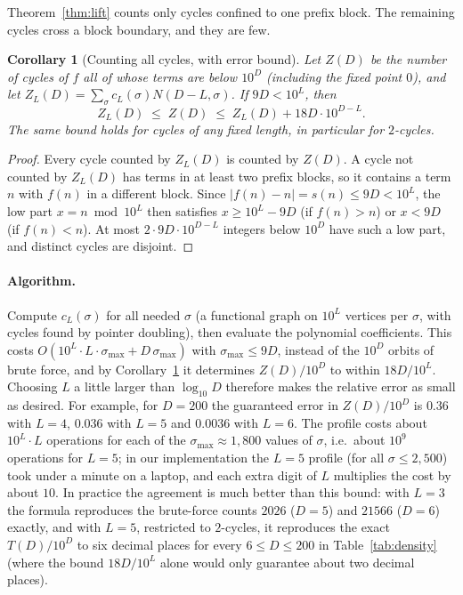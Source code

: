 \documentclass[11pt]{article}
\newtheorem{corollary}[theorem]{Corollary}
\theoremstyle{definition}
\theoremstyle{remark}
\begin{document}
Theorem~\ref{thm:lift} counts only cycles confined to one prefix block. The
remaining cycles cross a block boundary, and they are few.

\begin{corollary}[Counting all cycles, with error bound]\label{cor:lifterr}
Let $Z(D)$ be the number of cycles of $f$ all of whose terms are below $10^D$
(including the fixed point $0$), and let $Z_L(D)=\sum_\sigma
c_L(\sigma)N(D-L,\sigma)$. If $9D<10^L$, then
\[
  Z_L(D)\;\le\;Z(D)\;\le\;Z_L(D)+18D\cdot10^{D-L}.
\]
The same bound holds for cycles of any fixed length, in particular for
$2$-cycles.
\end{corollary}

\begin{proof}
Every cycle counted by $Z_L(D)$ is counted by $Z(D)$. A cycle not counted by
$Z_L(D)$ has terms in at least two prefix blocks, so it contains a term $n$
with $f(n)$ in a different block. Since $|f(n)-n|=s(n)\le9D<10^L$, the low
part $x=n\bmod10^L$ then satisfies $x\ge10^L-9D$ (if $f(n)>n$) or $x<9D$ (if
$f(n)<n$). At most $2\cdot9D\cdot10^{D-L}$ integers below $10^D$ have such a
low part, and distinct cycles are disjoint.
\end{proof}

\paragraph{Algorithm.} Compute $c_L(\sigma)$ for all needed $\sigma$ (a
functional graph on $10^L$ vertices per $\sigma$, with cycles found by pointer
doubling), then evaluate the polynomial coefficients. This costs
$O(10^L\cdot L\cdot\sigma_{\max}+D\,\sigma_{\max})$ with $\sigma_{\max}\le9D$,
instead of the $10^D$ orbits of brute force, and by
Corollary~\ref{cor:lifterr} it determines $Z(D)/10^D$ to within $18D/10^L$.
Choosing $L$ a little larger than $\log_{10}D$ therefore makes the relative
error as small as desired. For example, for $D=200$ the guaranteed error in
$Z(D)/10^D$ is $0.36$ with $L=4$, $0.036$ with $L=5$ and $0.0036$ with $L=6$.
The profile costs about $10^L\cdot L$ operations for each of the
$\sigma_{\max}\approx1{,}800$ values of $\sigma$, i.e.\ about $10^9$ operations
for $L=5$; in our implementation the $L=5$ profile (for all
$\sigma\le2{,}500$) took under a minute on a laptop, and each extra digit of
$L$ multiplies the cost by about $10$. In practice the agreement is much better than this
bound: with $L=3$ the formula reproduces the brute-force counts $2026$ ($D=5$)
and $21566$ ($D=6$) exactly, and with $L=5$, restricted to $2$-cycles, it
reproduces the exact $T(D)/10^D$ to six decimal places for every
$6\le D\le200$ in Table~\ref{tab:density} (where the bound
$18D/10^L$ alone would only guarantee about two decimal places).
\end{document}
